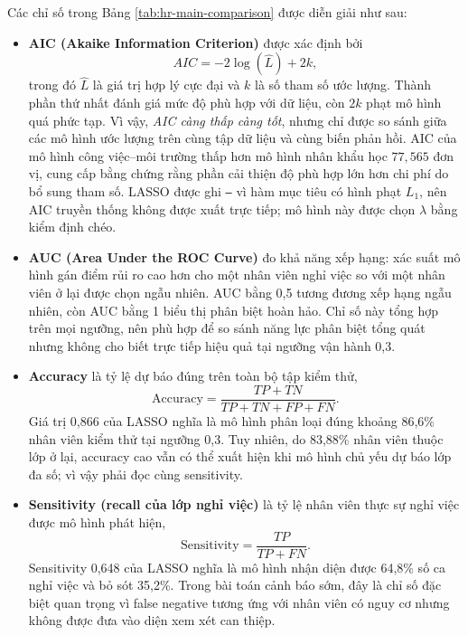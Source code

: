 Các chỉ số trong Bảng \ref{tab:hr-main-comparison} được diễn giải như
sau:

\begin{itemize}
  \item \textbf{AIC (Akaike Information Criterion)} được xác định bởi
  \[
    AIC=-2\log(\widehat{L})+2k,
  \]
  trong đó \(\widehat{L}\) là giá trị hợp lý cực đại và \(k\) là số tham
  số ước lượng. Thành phần thứ nhất đánh giá mức độ phù hợp với dữ liệu,
  còn \(2k\) phạt mô hình quá phức tạp. Vì vậy, \emph{AIC càng thấp càng
  tốt}, nhưng chỉ được so sánh giữa các mô hình ước lượng trên cùng tập
  dữ liệu và cùng biến phản hồi. AIC của mô hình công việc--môi trường
  thấp hơn mô hình nhân khẩu học \(77{,}565\) đơn vị, cung cấp bằng chứng
  rằng phần cải thiện độ phù hợp lớn hơn chi phí do bổ sung tham số.
  LASSO được ghi \texttt{--} vì hàm mục tiêu có hình phạt \(L_1\), nên
  AIC truyền thống không được xuất trực tiếp; mô hình này được chọn
  \(\lambda\) bằng kiểm định chéo.

  \item \textbf{AUC (Area Under the ROC Curve)} đo khả năng xếp hạng:
  xác suất mô hình gán điểm rủi ro cao hơn cho một nhân viên nghỉ việc
  so với một nhân viên ở lại được chọn ngẫu nhiên. AUC bằng 0,5 tương
  đương xếp hạng ngẫu nhiên, còn AUC bằng 1 biểu thị phân biệt hoàn hảo.
  Chỉ số này tổng hợp trên mọi ngưỡng, nên phù hợp để so sánh năng lực
  phân biệt tổng quát nhưng không cho biết trực tiếp hiệu quả tại ngưỡng
  vận hành 0,3.

  \item \textbf{Accuracy} là tỷ lệ dự báo đúng trên toàn bộ tập kiểm thử,
  \[
    \mathrm{Accuracy}=\frac{TP+TN}{TP+TN+FP+FN}.
  \]
  Giá trị 0,866 của LASSO nghĩa là mô hình phân loại đúng khoảng 86,6\%
  nhân viên kiểm thử tại ngưỡng 0,3. Tuy nhiên, do 83,88\% nhân viên
  thuộc lớp ở lại, accuracy cao vẫn có thể xuất hiện khi mô hình chủ yếu
  dự báo lớp đa số; vì vậy phải đọc cùng sensitivity.

  \item \textbf{Sensitivity (recall của lớp nghỉ việc)} là tỷ lệ nhân
  viên thực sự nghỉ việc được mô hình phát hiện,
  \[
    \mathrm{Sensitivity}=\frac{TP}{TP+FN}.
  \]
  Sensitivity 0,648 của LASSO nghĩa là mô hình nhận diện được 64,8\% số
  ca nghỉ việc và bỏ sót 35,2\%. Trong bài toán cảnh báo sớm, đây là chỉ
  số đặc biệt quan trọng vì false negative tương ứng với nhân viên có
  nguy cơ nhưng không được đưa vào diện xem xét can thiệp.
\end{itemize}

